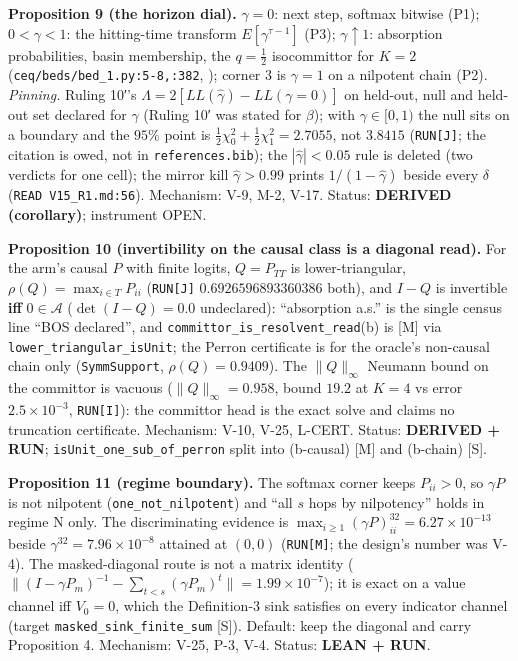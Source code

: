 \documentclass[11pt,a4paper]{article}
\theoremstyle{plain}
\theoremstyle{definition}
\theoremstyle{remark}
\begin{document}
\textbf{Proposition 9 (the horizon dial).} \(\gamma=0\): next step,
softmax bitwise (P1); \(0<\gamma<1\): the hitting-time transform
\(E[\gamma^{\tau-1}]\) (P3); \(\gamma\uparrow1\): absorption
probabilities, basin membership, the \(q=\tfrac12\) isocommittor for
\(K=2\) (\texttt{ceq/beds/bed\_1.py:5-8,:382},
\citep{e-2010-tptreview}); corner 3 is \(\gamma=1\) on a nilpotent chain
(P2). \emph{Pinning.} Ruling 10′'s
\(\Lambda=2[LL(\hat\gamma)-LL(\gamma=0)]\) on held-out, null and
held-out set declared for \(\gamma\) (Ruling 10′ was stated for
\(\beta\)); with \(\gamma\in[0,1)\) the null sits on a boundary and the
\(95\%\) point is \(\tfrac12\chi^2_0+\tfrac12\chi^2_1=2.7055\), not
\(3.8415\) (\texttt{RUN{[}J{]}}; the citation is owed, not in
\texttt{references.bib}); the \(|\hat\gamma|<0.05\) rule is deleted (two
verdicts for one cell); the mirror kill \(\hat\gamma>0.99\) prints
\(1/(1-\hat\gamma)\) beside every \(\delta\)
(\texttt{READ\ V15\_R1.md:56}). Mechanism: V-9, M-2, V-17. Status:
\textbf{DERIVED (corollary)}; instrument OPEN.

\textbf{Proposition 10 (invertibility on the causal class is a diagonal
read).} For the arm's causal \(P\) with finite logits, \(Q=P_{TT}\) is
lower-triangular, \(\rho(Q)=\max_{i\in T}P_{ii}\) (\texttt{RUN{[}J{]}}
\(0.6926596893360386\) both), and \(I-Q\) is invertible \textbf{iff}
\(0\in\mathcal A\) (\(\det(I-Q)=0.0\) undeclared): ``absorption a.s.''
is the single census line ``BOS declared'', and
\texttt{committor\_is\_resolvent\_read}(b) is {[}M{]} via
\texttt{lower\_triangular\_isUnit}; the Perron certificate is for the
oracle's non-causal chain only (\texttt{SymmSupport},
\(\rho(Q)=0.9409\)). The \(\|Q\|_\infty\) Neumann bound on the committor
is vacuous (\(\|Q\|_\infty=0.958\), bound \(19.2\) at \(K=4\) vs error
\(2.5\times10^{-3}\), \texttt{RUN{[}I{]}}): the committor head is the
exact solve and claims no truncation certificate. Mechanism: V-10, V-25,
L-CERT. Status: \textbf{DERIVED + RUN};
\texttt{isUnit\_one\_sub\_of\_perron} split into (b-causal) {[}M{]} and
(b-chain) {[}S{]}.

\textbf{Proposition 11 (regime boundary).} The softmax corner keeps
\(P_{ii}>0\), so \(\gamma P\) is not nilpotent
(\texttt{one\_not\_nilpotent}) and ``all \(s\) hops by nilpotency''
holds in regime N only. The discriminating evidence is
\(\max_{i\ge1}(\gamma P)^{32}_{ii}=6.27\times10^{-13}\) beside
\(\gamma^{32}=7.96\times10^{-8}\) attained at \((0,0)\)
(\texttt{RUN{[}M{]}}; the design's number was V-4). The masked-diagonal
route is not a matrix identity
(\(\|(I-\gamma P_m)^{-1}-\sum_{t<s}(\gamma P_m)^t\|=1.99\times10^{-7}\));
it is exact on a value channel iff \(V_0=0\), which the Definition-3
sink satisfies on every indicator channel (target
\texttt{masked\_sink\_finite\_sum} {[}S{]}). Default: keep the diagonal
and carry Proposition 4. Mechanism: V-25, P-3, V-4. Status: \textbf{LEAN
+ RUN}.
\end{document}
